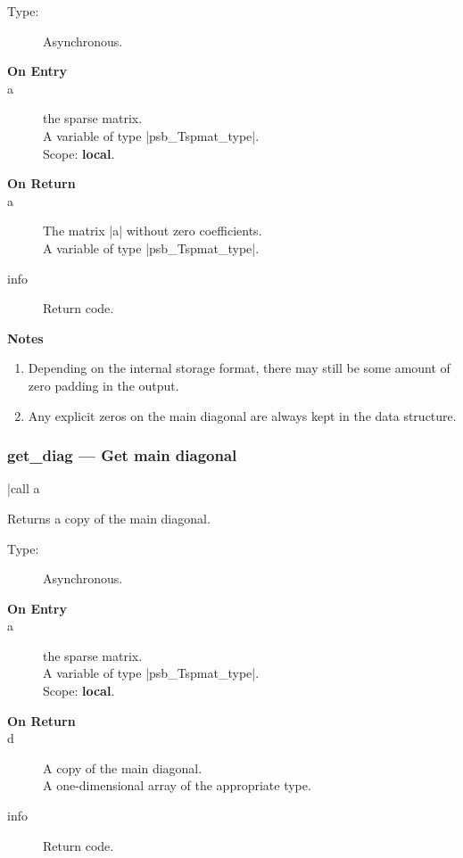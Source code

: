 \begin{description}
\item[Type:] Asynchronous.
\item[\bf On Entry]
\item[a] the sparse matrix.\\
A variable of type \fortinline|psb_Tspmat_type|.\\
Scope: {\bf local}.\\
\end{description}
\begin{description}
\item[\bf On Return]
\item[a] The matrix  \fortinline|a| without zero coefficients.\\
A variable of type \fortinline|psb_Tspmat_type|.
\item[info] Return code. 
\end{description}
{\par\noindent\bfseries Notes}
\begin{enumerate}
\item Depending on the internal storage format, there may still be some amount of 
  zero padding in the output.
\item Any explicit zeros on the main diagonal are always kept in the
  data structure. 
\end{enumerate}

\subsubsection{get\_diag --- Get main diagonal}
\fortinline|call a%

Returns a copy of  the main diagonal.
\begin{description}
\item[Type:] Asynchronous.
\item[\bf On Entry]
\item[a] the sparse matrix.\\
A variable of type \fortinline|psb_Tspmat_type|.\\
Scope: {\bf local}.\\
\end{description}
\begin{description}
\item[\bf On Return]
\item[d] A copy  of the main diagonal.\\
A one-dimensional array of the appropriate type.
\item[info] Return code. 
\end{description}


